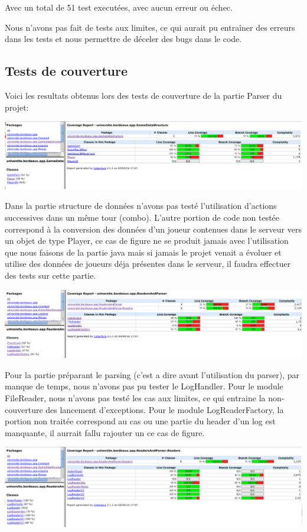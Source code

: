 Avec un total de 51 test executées, avec aucun erreur ou échec.

Nous n'avons pas fait de tests aux limites, ce qui aurait pu entraîner des erreurs dans les tests et nous permettre de déceler des bugs dans le code.

\subsection{Tests de couverture}
Voici les resultats obtenus lors des tests de couverture de la partie Parser du projet:

\includegraphics[scale=0.35,keepaspectratio]{./coverage_GameDataStructure}

Dans la partie structure de données n'avons pas testé l'utilisation d'actions successives dans un même tour (combo). L'autre portion de code non testée correspond à la conversion des données d'un joueur contenues dans le serveur vers un objet de type Player, ce cas de figure ne se produit jamais avec l'utilisation que nous faisons de la partie java mais si jamais le projet venait a évoluer et utilise des données de joueurs déja présentes dans le serveur, il faudra effectuer des tests sur cette partie.

\includegraphics[scale=0.35,keepaspectratio]{./coverage_ReadersAndParser}

Pour la partie préparant le parsing (c'est a dire avant l'utilisation du parser), par manque de temps, nous n'avons pas pu tester le LogHandler. Pour le module FileReader, nous n'avons pas testé les cas aux limites, ce qui entraine la non-couverture des lancement d'exceptions. Pour le module LogReaderFactory, la portion non traitée correspond au cas ou une partie du header d'un log est manquante, il aurrait fallu rajouter un ce cas de figure.

\includegraphics[scale=0.35,keepaspectratio]{./coverage_ReadersLog}

